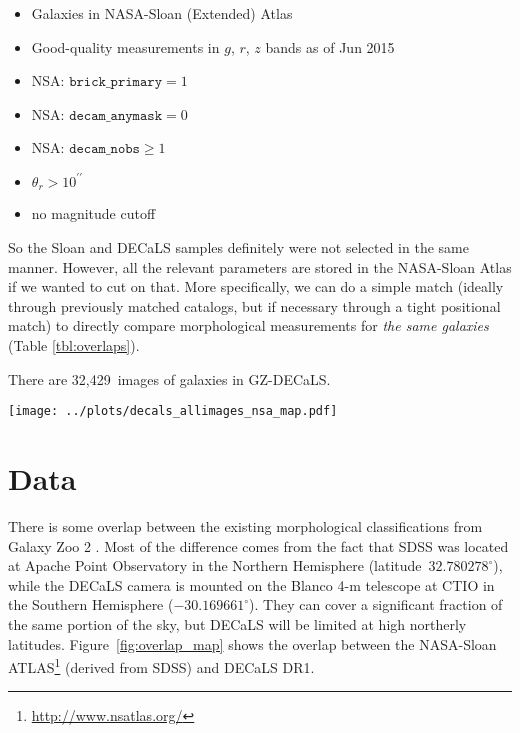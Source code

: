 \documentclass[iop,apj,tighten]{emulateapj}
\begin{document}
\begin{itemize}
    \item Galaxies in NASA-Sloan (Extended) Atlas
    \item Good-quality measurements in $g$, $r$, $z$ bands as of Jun 2015
    \item NSA: $\texttt{brick\_primary} = 1$
    \item NSA: $\texttt{decam\_anymask} = 0$
    \item NSA: $\texttt{decam\_nobs} \geq 1$
    \item $\theta_r > 10^{\prime\prime}$
    \item no magnitude cutoff
\end{itemize}

So the Sloan and DECaLS samples definitely were not selected in the same manner. However, all the relevant parameters are stored in the NASA-Sloan Atlas if we wanted to cut on that. More specifically, we can do a simple match (ideally through previously matched catalogs, but if necessary through a tight positional match) to directly compare morphological measurements for \emph{the same galaxies} (Table \ref{tbl:overlaps}).

There are 32,429~images of galaxies in GZ-DECaLS.

\begin{figure*}
\centering
\texttt{[image: ../plots/decals\_allimages\_nsa\_map.pdf]}
\caption{Overlap between galaxies in the NASA-Sloan Atlas (red) and selected targets for Galaxy Zoo from DECaLS DR1 (blue).\label{fig:overlap_map}}
\end{figure*}

\section{Data}

There is some overlap between the existing morphological classifications from Galaxy Zoo 2 \citep{wil13}. Most of the difference comes from the fact that SDSS was located at Apache Point Observatory in the Northern Hemisphere (latitude~$32.780278^\circ$), while the DECaLS camera is mounted on the Blanco 4-m telescope at CTIO in the Southern Hemisphere ($-30.169661^\circ$). They can cover a significant fraction of the same portion of the sky, but DECaLS will be limited at high northerly latitudes. Figure~\ref{fig:overlap_map} shows the overlap between the NASA-Sloan ATLAS\footnote{\url{http://www.nsatlas.org/}} (derived from SDSS) and DECaLS DR1. 
\end{document}
